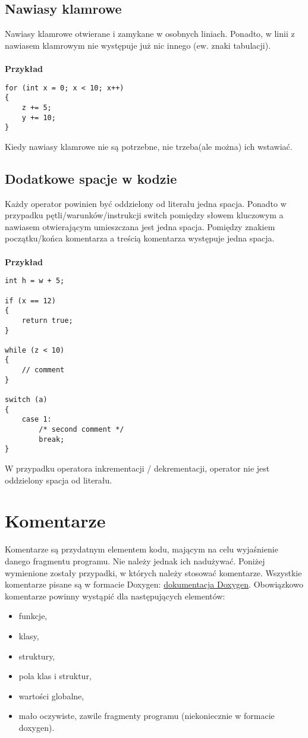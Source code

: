 \documentclass[titlepage]{article}
\begin{document}
\subsection{Nawiasy klamrowe}
Nawiasy klamrowe otwierane i zamykane w osobnych liniach. Ponadto, w linii z nawiasem klamrowym nie występuje już nic innego (ew. znaki tabulacji).

\paragraph{}
\textbf{Przykład}
\begin{lstlisting}
for (int x = 0; x < 10; x++)
{
	z += 5;
	y += 10;
}
\end{lstlisting}
Kiedy nawiasy klamrowe nie są potrzebne, nie trzeba(ale można) ich wstawiać.

\subsection{Dodatkowe spacje w kodzie}
Każdy operator powinien być oddzielony od literału jedna spacja. Ponadto w przypadku pętli/warunków/instrukcji switch pomiędzy słowem kluczowym a nawiasem otwierającym umieszczana jest jedna spacja. Pomiędzy znakiem początku/końca komentarza a treścią komentarza występuje jedna spacja.
\paragraph{}
\textbf{Przykład}
\begin{lstlisting}
int h = w + 5;

if (x == 12)
{
	return true;
}

while (z < 10)
{
	// comment
}

switch (a)
{
	case 1:
		/* second comment */
		break;
}
\end{lstlisting}
W przypadku operatora inkrementacji / dekrementacji, operator nie jest oddzielony spacja od literału.
\section{Komentarze}
Komentarze są przydatnym elementem kodu, mającym na celu wyjaśnienie danego fragmentu programu. Nie należy jednak ich nadużywać. Poniżej wymienione zostały przypadki, w których należy stosować komentarze. 
Wszystkie komentarze pisane są w formacie Doxygen: \href{http://doxygen.org/}{dokumentacja Doxygen}.
Obowiązkowo komentarze powinny wystąpić dla następujących elementów:
\begin{itemize}
\item funkcje,
\item klasy,
\item struktury,
\item pola klas i struktur,
\item wartości globalne,
\item mało oczywiste, zawile fragmenty programu (niekoniecznie w formacie doxygen).
\end{itemize}
\end{document}
